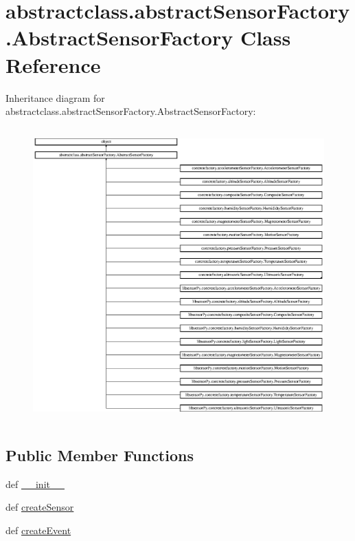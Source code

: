 \hypertarget{classabstractclass_1_1abstractSensorFactory_1_1AbstractSensorFactory}{}\section{abstractclass.\+abstract\+Sensor\+Factory.\+Abstract\+Sensor\+Factory Class Reference}
\label{classabstractclass_1_1abstractSensorFactory_1_1AbstractSensorFactory}
Inheritance diagram for abstractclass.\+abstract\+Sensor\+Factory.\+Abstract\+Sensor\+Factory\+:\begin{figure}[H]
\begin{center}
\leavevmode
\includegraphics[height=11.307693cm]{classabstractclass_1_1abstractSensorFactory_1_1AbstractSensorFactory}
\end{center}
\end{figure}
\subsection*{Public Member Functions}
\begin{DoxyCompactItemize}
\item 
def \hyperlink{classabstractclass_1_1abstractSensorFactory_1_1AbstractSensorFactory_afcbee288361cb64ef97fd61085c8ae95}{\+\_\+\+\_\+init\+\_\+\+\_\+}
\item 
def \hyperlink{classabstractclass_1_1abstractSensorFactory_1_1AbstractSensorFactory_a391fce6b5f9bf29c62fa7dc0eea19630}{create\+Sensor}
\item 
def \hyperlink{classabstractclass_1_1abstractSensorFactory_1_1AbstractSensorFactory_a6304a9fb485d40dd539284cc51a27498}{create\+Event}
\end{DoxyCompactItemize}

